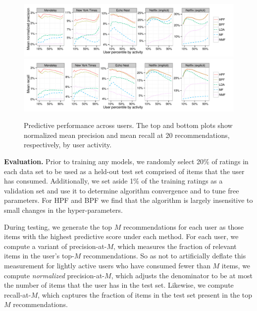 \begin{figure}[t!]
\centering
\includegraphics[width=\textwidth]{figures/mean_precision_at_20_by_user_percentile.pdf}\\
\includegraphics[width=\textwidth]{figures/mean_recall_at_20_by_user_percentile.pdf}\\
\caption{Predictive performance across users. The top and bottom plots
  show normalized mean precision and mean recall at 20
  recommendations, respectively, by user activity.}
\label{fig:precision_recall_by_user_activity}
\end{figure}

{\bf Evaluation.} Prior to training any models, we randomly select
20\% of ratings in each data set to be used as a held-out test set
comprised of items that the user has consumed. Additionally, we set
aside 1\% of the training ratings as a validation set and use it to
determine algorithm convergence and to tune free parameters. For HPF
and BPF we find that the algorithm is largely insensitive to small
changes in the hyper-parameters.

During testing, we generate the top $M$ recommendations for each user
as those items with the highest predictive score under each
method. For each user, we compute a variant of precision-at-$M$, which
measures the fraction of relevant items in the user's top-$M$
recommendations. So as not to artificially deflate this measurement
for lightly active users who have consumed fewer than $M$ items, we
compute {\it normalized} precision-at-$M$, which adjusts the
denominator to be at most the number of items that the user has in the
test set. Likewise, we compute recall-at-$M$, which captures the
fraction of items in the test set present in the top $M$
recommendations.


